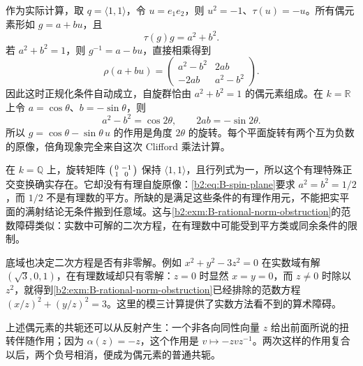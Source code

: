作为实际计算，取 \(q=\langle1,1\rangle\)，令 \(u=e_1e_2\)，则 \(u^2=-1\)、\(\tau(u)=-u\)。所有偶元素形如 \(g=a+bu\)，且
\[
	\tau(g)g=a^2+b^2.
\]
若 \(a^2+b^2=1\)，则 \(g^{-1}=a-bu\)，直接相乘得到
\begin{equation}\label{b2:eq:B-spin-plane}
	\rho(a+bu)=
	\begin{pmatrix}a^2-b^2&2ab\\-2ab&a^2-b^2\end{pmatrix}.
\end{equation}
因此这时正规化条件自动成立，自旋群恰由 \(a^2+b^2=1\) 的偶元素组成。在 \(k=\mathbb R\) 上令 \(a=\cos\theta\)、\(b=-\sin\theta\)，则
\[
	a^2-b^2=\cos2\theta,\qquad 2ab=-\sin2\theta.
\]
所以 \(g=\cos\theta-\sin\theta\,u\) 的作用是角度 \(2\theta\) 的旋转。每个平面旋转有两个互为负数的原像，倍角现象完全来自这次 Clifford 乘法计算。

\ProseParagraphBreak
在 \(k=\mathbb Q\) 上，旋转矩阵 \(\begin{psmallmatrix}0&-1\\1&0\end{psmallmatrix}\) 保持 \(\langle1,1\rangle\)，且行列式为一，所以这个有理特殊正交变换确实存在。它却没有有理自旋原像：\eqref{b2:eq:B-spin-plane}要求 \(a^2=b^2=1/2\)，而 \(1/2\) 不是有理数的平方。所缺的是满足这些条件的有理作用元，不能把实平面的满射结论无条件搬到任意域。这与\cref{b2:exm:B-rational-norm-obstruction}的范数障碍类似：实数中可解的二次方程，在有理数中可能受到平方类或同余条件的限制。

\ProseParagraphBreak
底域也决定二次方程是否有非零解。例如 \(x^2+y^2-3z^2=0\) 在实数域有解 \((\sqrt3,0,1)\)，在有理数域却只有零解：\(z=0\) 时显然 \(x=y=0\)，而 \(z\ne0\) 时除以 \(z^2\)，就得到\cref{b2:exm:B-rational-norm-obstruction}已经排除的范数方程 \((x/z)^2+(y/z)^2=3\)。这里的模三计算提供了实数方法看不到的算术障碍。

\ProseParagraphBreak
上述偶元素的共轭还可以从反射产生：一个非各向同性向量 \(z\) 给出前面所说的扭转伴随作用；因为 \(\alpha(z)=-z\)，这个作用是 \(v\mapsto-zvz^{-1}\)。两次这样的作用复合以后，两个负号相消，便成为偶元素的普通共轭。

